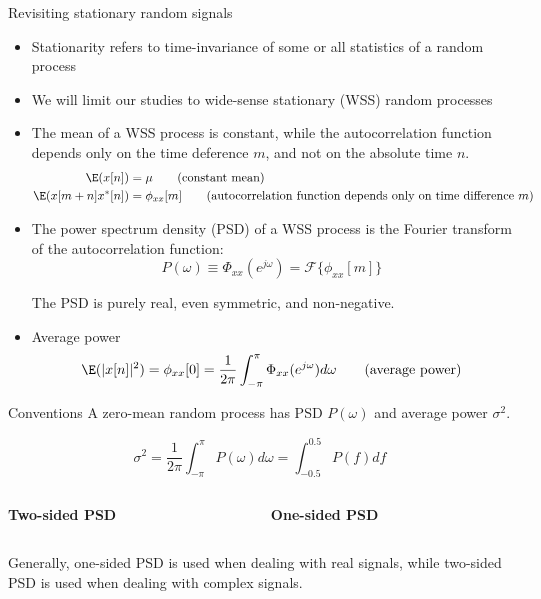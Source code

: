 \documentclass[10pt, aspectratio=169, handout]{beamer}
\begin{document}
\begin{frame}{Revisiting stationary random signals}
	\begin{itemize}
		\item Stationarity refers to time-invariance of some or all statistics of a random process
		\item We will limit our studies to wide-sense stationary (WSS) random processes
		\item The mean of a WSS process is constant, while the autocorrelation function depends only on the time deference $m$, and not on the absolute time $n$.
		\begin{align}
			\E(x[n]) &=\mu \tag{constant mean} \\
			\E(x[m+n]x^*[n]) &= \phi_{xx}[m] \tag{autocorrelation function depends only on time difference $m$}
		\end{align}
		\item The power spectrum density (PSD) of a WSS process is the Fourier transform of the autocorrelation function:
		\begin{equation*}
			P(\omega) \equiv \Phi_{xx}(e^{j\omega}) = \mathcal{F}\{\phi_{xx}[m]\}
		\end{equation*}
		
		The PSD is purely real, even symmetric, and non-negative. 
		\item Average power
		\begin{equation}
			\E(|x[n]|^2) = \phi_{xx}[0] = \frac{1}{2\pi}\int_{-\pi}^{\pi} \Phi_{xx}(e^{j\omega}) d\omega \tag{average power}
		\end{equation}
	\end{itemize}
\end{frame}

\begin{frame}{Conventions}
A zero-mean random process has PSD $P(\omega)$ and average power $\sigma^2$.

\begin{equation*}
	\sigma^2 = \frac{1}{2\pi} \int_{-\pi}^{\pi} P(\omega)d\omega = \int_{-0.5}^{0.5} P(f)df
\end{equation*}

\begin{columns}
	\begin{column}{0.5\textwidth}
		\textbf{Two-sided PSD}
	\end{column}

	\begin{column}{0.5\textwidth}
		\textbf{One-sided PSD}
	\end{column}
\end{columns}
\hspace{0.5cm}\resizebox{0.8\textwidth}{!}{}

Generally, one-sided PSD is used when dealing with real signals, while two-sided PSD is used when dealing with complex signals.
\end{frame}
\end{document}
